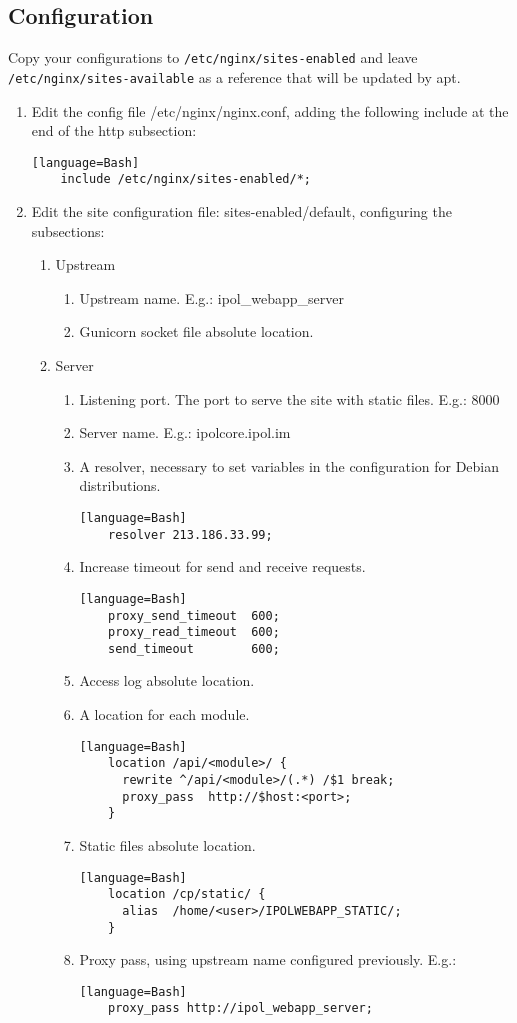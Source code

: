 \documentclass[a4paper,12pt]{article}
\begin{document}
\subsection{Configuration}

Copy your configurations to {\tt /etc/nginx/sites-enabled} and leave {\tt /etc/nginx/sites-available} as a reference that will be updated by apt.

\begin{enumerate}
    \item Edit the config file /etc/nginx/nginx.conf, adding the following include at the end of the http subsection:
    \begin{verbatim}[language=Bash]
    include /etc/nginx/sites-enabled/*;
    \end{verbatim}
    \item Edit the site configuration file: sites-enabled/default, configuring the subsections:
    \begin{enumerate}
    \item Upstream
    \begin{enumerate}
    \item Upstream name. E.g.: ipol\_webapp\_server
    \item Gunicorn socket file absolute location.
    \end{enumerate}
    \item Server
    \begin{enumerate}
    \item Listening port. The port to serve the site with static files. E.g.: 8000
    \item Server name. E.g.: ipolcore.ipol.im
    \item A resolver, necessary to set variables in the configuration for Debian distributions.
    \begin{verbatim}[language=Bash]
    resolver 213.186.33.99;
    \end{verbatim}
    \item Increase timeout for send and receive requests.
    \begin{verbatim}[language=Bash]
    proxy_send_timeout	600;
    proxy_read_timeout	600;
    send_timeout		600;
    \end{verbatim}
    \item Access log absolute location.
    \item A location for each module.
    \begin{verbatim}[language=Bash]
    location /api/<module>/ {
      rewrite ^/api/<module>/(.*) /$1 break;
      proxy_pass  http://$host:<port>;
    }
    \end{verbatim}
    \item Static files absolute location.
    \begin{verbatim}[language=Bash]
    location /cp/static/ {
      alias  /home/<user>/IPOLWEBAPP_STATIC/;
    }
    \end{verbatim}
    \item Proxy pass, using upstream name configured previously.
    E.g.:
    \begin{verbatim}[language=Bash]
    proxy_pass http://ipol_webapp_server;
    \end{verbatim}


\end{enumerate}
\end{enumerate}
\end{enumerate}
\end{document}
